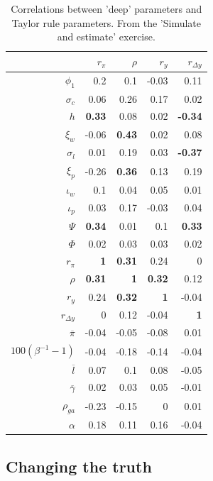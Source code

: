 \documentclass[11pt]{article}
\begin{document}
\begin{table}[t]

\caption{\label{tab:covary-with-Taylor}Correlations between 'deep' parameters and Taylor rule parameters. From the 
             'Simulate and estimate' exercise.}
\centering
\begin{tabular}{rrrrr}
\toprule
 & $r_\pi$ & $\rho$ & $r_y$ & $r_{\Delta y}$\\
\midrule
$\phi_1$ & 0.2 & 0.1 & -0.03 & 0.11\\
$\sigma_c$ & 0.06 & 0.26 & 0.17 & 0.02\\
$h$ & \textbf{0.33} & 0.08 & 0.02 & \textbf{-0.34}\\
$\xi_w$ & -0.06 & \textbf{0.43} & 0.02 & 0.08\\
$\sigma_l$ & 0.01 & 0.19 & 0.03 & \textbf{-0.37}\\
\addlinespace
$\xi_p$ & -0.26 & \textbf{0.36} & 0.13 & 0.19\\
$\iota_w$ & 0.1 & 0.04 & 0.05 & 0.01\\
$\iota_p$ & 0.03 & 0.17 & -0.03 & 0.04\\
$\Psi$ & \textbf{0.34} & 0.01 & 0.1 & \textbf{0.33}\\
$\Phi$ & 0.02 & 0.03 & 0.03 & 0.02\\
\addlinespace
$r_\pi$ & \textbf{1} & \textbf{0.31} & 0.24 & 0\\
$\rho$ & \textbf{0.31} & \textbf{1} & \textbf{0.32} & 0.12\\
$r_y$ & 0.24 & \textbf{0.32} & \textbf{1} & -0.04\\
$r_{\Delta y}$ & 0 & 0.12 & -0.04 & \textbf{1}\\
$\overline{\pi}$ & -0.04 & -0.05 & -0.08 & 0.01\\
\addlinespace
$100(\beta^{-1} -1)$ & -0.04 & -0.18 & -0.14 & -0.04\\
$\overline{l}$ & 0.07 & 0.1 & 0.08 & -0.05\\
$\overline{\gamma}$ & 0.02 & 0.03 & 0.05 & -0.01\\
$\rho_{ga}$ & -0.23 & -0.15 & 0 & 0.01\\
$\alpha$ & 0.18 & 0.11 & 0.16 & -0.04\\
\bottomrule
\end{tabular}
\end{table}

\hypertarget{changing-the-truth}{%
\subsection{Changing the truth}\label{changing-the-truth}}
\end{document}
